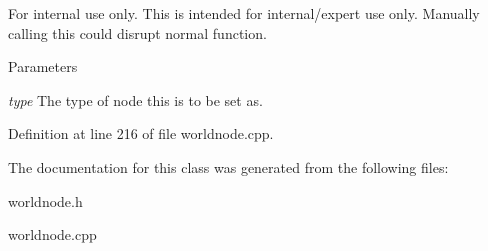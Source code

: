 \begin{DoxyInternal}{For internal use only.}
This is intended for internal/expert use only. Manually calling this could disrupt normal function. 
\begin{DoxyParams}{Parameters}
\item[{\em type}]The type of node this is to be set as. \end{DoxyParams}
\end{DoxyInternal}


Definition at line 216 of file worldnode.cpp.



The documentation for this class was generated from the following files:\begin{DoxyCompactItemize}
\item 
worldnode.h\item 
worldnode.cpp\end{DoxyCompactItemize}
